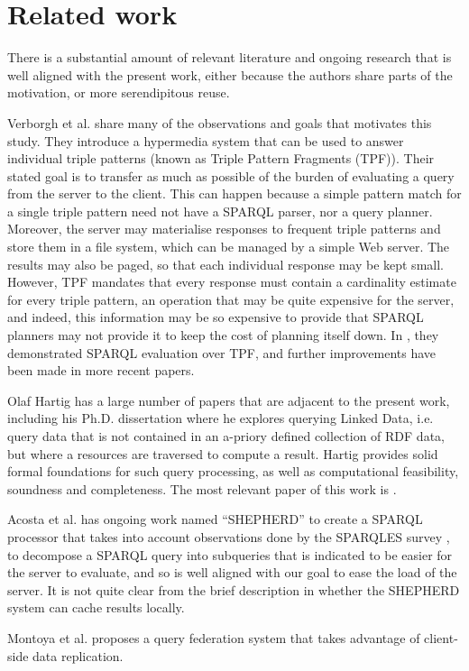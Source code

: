 \section{Related work}\label{sec:related}

There is a substantial amount of relevant literature and ongoing
research that is well aligned with the present work, either because
the authors share parts of the motivation, or more serendipitous
reuse.

Verborgh et al. \cite{TODO} share many of the observations and goals
that motivates this study. They introduce a hypermedia system that can
be used to answer individual triple patterns (known as Triple Pattern
Fragments (TPF)). Their stated goal is to transfer as much as possible
of the burden of evaluating a query from the server to the
client. This can happen because a simple pattern match for a single
triple pattern need not have a SPARQL parser, nor a query
planner. Moreover, the server may materialise responses to frequent
triple patterns and store them in a file system, which can be managed
by a simple Web server. The results may also be paged, so that each
individual response may be kept small. However, TPF mandates that
every response must contain a cardinality estimate for every triple
pattern, an operation that may be quite expensive for the server, and
indeed, this information may be so expensive to provide that SPARQL
planners may not provide it to keep the cost of planning itself
down. In \cite{TODO}, they demonstrated SPARQL evaluation over TPF,
and further improvements have been made in more recent papers.

Olaf Hartig has a large number of papers that are adjacent to the
present work, including his Ph.D. dissertation \cite{TODO} where he
explores querying Linked Data, i.e. query data that is not contained
in an a-priory defined collection of RDF data, but where a resources
are traversed to compute a result. Hartig provides solid formal
foundations for such query processing, as well as computational
feasibility, soundness and completeness. The most relevant paper of
this work is \cite{TODO}.

Acosta et al. \cite{TODO} has ongoing work named ``SHEPHERD'' to
create a SPARQL processor that takes into account observations done by
the SPARQLES survey \cite{TODO}, to decompose a SPARQL query into
subqueries that is indicated to be easier for the server to evaluate,
and so is well aligned with our goal to ease the load of the
server. It is not quite clear from the brief description in 
\cite{TODO} whether the SHEPHERD system can cache results locally.

Montoya et al. \cite{DBLP:journals/corr/MontoyaSMV15} proposes a query
federation system that takes advantage of client-side data
replication. 

